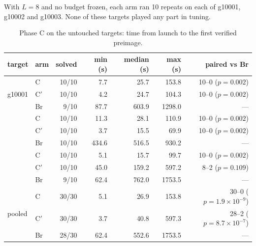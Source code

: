 \documentclass[11pt,a4paper]{article}
\begin{document}
With $L=8$ and no budget frozen, each arm ran 10 repeats on each of g10001, g10002 and g10003. None
of these targets played any part in tuning.

\begin{table}[h]\centering\small
\begin{tabular}{@{}llrrrrr@{}}
\toprule
\textbf{target} & \textbf{arm} & \textbf{solved} & \textbf{min (s)} & \textbf{median (s)} & \textbf{max (s)} & \textbf{paired vs Br}\\
\midrule
\multirow{3}{*}{g10001} & C & 10/10 & 7.7 & 25.7 & 153.8 & 10--0 ($p=0.002$)\\
 & C$'$ & 10/10 & 4.2 & 24.7 & 104.3 & 10--0 ($p=0.002$)\\
 & Br & 9/10 & 87.7 & 603.9 & 1298.0 & ---\\
\addlinespace
\multirow{3}{*}{g10002} & C & 10/10 & 11.3 & 28.1 & 110.9 & 10--0 ($p=0.002$)\\
 & C$'$ & 10/10 & 3.7 & 15.5 & 69.9 & 10--0 ($p=0.002$)\\
 & Br & 10/10 & 434.6 & 516.5 & 930.2 & ---\\
\addlinespace
\multirow{3}{*}{g10003} & C & 10/10 & 5.1 & 15.7 & 99.7 & 10--0 ($p=0.002$)\\
 & C$'$ & 10/10 & 45.0 & 159.2 & 597.2 & 8--2 ($p=0.109$)\\
 & Br & 9/10 & 62.4 & 762.0 & 1753.5 & ---\\
\midrule
\multirow{3}{*}{pooled} & C & 30/30 & 5.1 & 26.9 & 153.8 & 30--0 ($p=1.9{\times}10^{-9}$)\\
 & C$'$ & 30/30 & 3.7 & 40.8 & 597.3 & 28--2 ($p=8.7{\times}10^{-7}$)\\
 & Br & 28/30 & 62.4 & 552.6 & 1753.5 & ---\\
\bottomrule
\end{tabular}
\caption{Phase C on the untouched targets: time from launch to the first verified preimage.}
\label{tab:phaseC}
\end{table}
\end{document}
